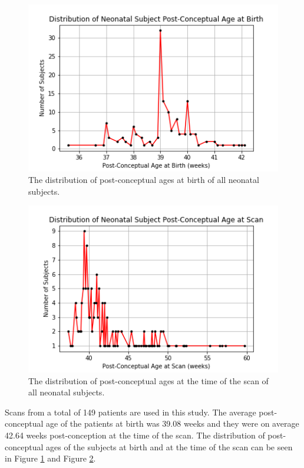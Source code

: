 \begin{figure}
\centering
\includegraphics[width=.75\textwidth]{5/demo_neonate_subj_pca.png}
\caption{The distribution of post-conceptual ages at birth of all neonatal subjects.}
\label{ch5:neonates:birthpca}
\end{figure}

\begin{figure}
\centering
\includegraphics[width=.75\textwidth]{5/demo_neonate_scan_pca.png}
\caption{The distribution of post-conceptual ages at the time of the scan of all neonatal subjects.}
\label{ch5:neonates:scanpca}
\end{figure}

Scans from a total of 149 patients are used in this study. The average post-conceptual age of the patients at birth was 39.08 weeks and they were on average 42.64 weeks post-conception at the time of the scan. The distribution of post-conceptual ages of the subjects at birth and at the time of the scan can be seen in Figure \ref{ch5:neonates:birthpca} and Figure \ref{ch5:neonates:scanpca}. 

